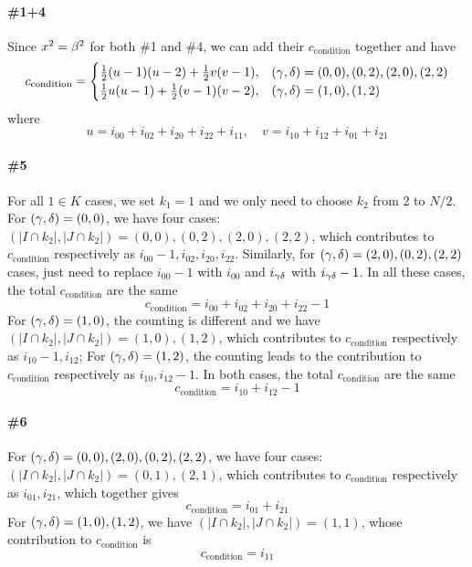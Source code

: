 \documentclass[11pt]{article}
\renewcommand{\>}{\rangle}
\newcommand{\<}{\langle}
\begin{document}
\paragraph{\#1+4} Since $x^{2}=\beta^{2}$ for both \#1 and \#4, we can add
their $c_{\text{condition}}$ together and have
\begin{equation}
c_{\text{condition}}=\begin{cases}
\frac{1}{2}(u-1)(u-2)+\frac{1}{2}v(v-1), & (\gamma,\delta)=(0,0),(0,2),(2,0),(2,2)\\
\frac{1}{2}u(u-1)+\frac{1}{2}(v-1)(v-2), & (\gamma,\delta)=(1,0),(1,2)
\end{cases}
\end{equation}
where 
\begin{equation}
u=i_{00}+i_{02}+i_{20}+i_{22}+i_{11},\quad v=i_{10}+i_{12}+i_{01}+i_{21}
\end{equation}
\paragraph{\#5} For all $1\in K$ cases, we set $k_{1}=1$ and we only need
to choose $k_{2}$ from 2 to $N/2$. For $(\gamma,\delta)=(0,0)$, we have
four cases: $(|I\cap k_{2}|,|J\cap k_{2}|)=(0,0),(0,2),(2,0),(2,2)$,
which contributes to $c_{\text{condition}}$ respectively as $i_{00}-1,i_{02},i_{20},i_{22}$.
Similarly, for $(\gamma,\delta)=(2,0),(0,2),(2,2)$ cases, just need to replace
$i_{00}-1$ with $i_{00}$ and $i_{\gamma\delta}$ with $i_{\gamma\delta}-1$. In
all these cases, the total $c_{\text{condition}}$ are the same 
\begin{equation}
c_{\text{condition}}=i_{00}+i_{02}+i_{20}+i_{22}-1
\end{equation}
For $(\gamma,\delta)=(1,0)$, the counting is different and we have $(|I\cap k_{2}|,|J\cap k_{2}|)=(1,0),(1,2)$,
which contributes to $c_{\text{condition}}$ respectively as $i_{10}-1,i_{12}$;
For $(\gamma,\delta)=(1,2)$, the counting leads to the contribution to $c_{\text{condition}}$
respectively as $i_{10},i_{12}-1$. In both cases, the total $c_{\text{condition}}$
are the same 
\begin{equation}
c_{\text{condition}}=i_{10}+i_{12}-1
\end{equation}
\paragraph{\#6} For $(\gamma,\delta)=(0,0),(2,0),(0,2),(2,2)$, we have four cases:
$(|I\cap k_{2}|,|J\cap k_{2}|)=(0,1),(2,1)$, which contributes to
$c_{\text{condition}}$ respectively as $i_{01},i_{21}$, which together
gives
\begin{equation}
c_{\text{condition}}=i_{01}+i_{21}
\end{equation}
For $(\gamma,\delta)=(1,0),(1,2)$, we have $(|I\cap k_{2}|,|J\cap k_{2}|)=(1,1)$,
whose contribution to $c_{\text{condition}}$ is
\begin{equation}
c_{\text{condition}}=i_{11}
\end{equation}
\end{document}
